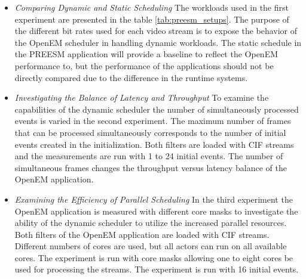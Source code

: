 \begin{itemize}
    \item \textit{Comparing Dynamic and Static Scheduling}
    The workloads used in the first experiment are presented in the table \ref{tab:preesm_setups}. The purpose of the different bit rates used for each video stream is to expose the behavior of the OpenEM scheduler in handling dynamic workloads. The static schedule in the PREESM application will provide a baseline to reflect the OpenEM performance to, but the performance of the applications should not be directly compared due to the difference in the runtime systems.

\item \textit{Investigating the Balance of Latency and Throughput}
To examine the capabilities of the dynamic scheduler the number of simultaneously processed events is varied in the second experiment. The maximum number of frames that can be processed simultaneously corresponds to the number of initial events created in the initialization. Both filters are loaded with CIF streams and the measurements are run with 1 to 24 initial events. The number of simultaneous frames changes the throughput versus latency balance of the OpenEM application.

\item \textit{Examining the Efficiency of Parallel Scheduling}
In the third experiment the OpenEM application is measured with different core masks to investigate the ability of the dynamic scheduler to utilize the increased parallel resources. Both filters of the OpenEM application are loaded with CIF streams. Different numbers of cores are used, but all actors can run on all available cores. The experiment is run with core masks allowing one to eight cores be used for processing the streams. The experiment is run with 16 initial events.
\end{itemize}
